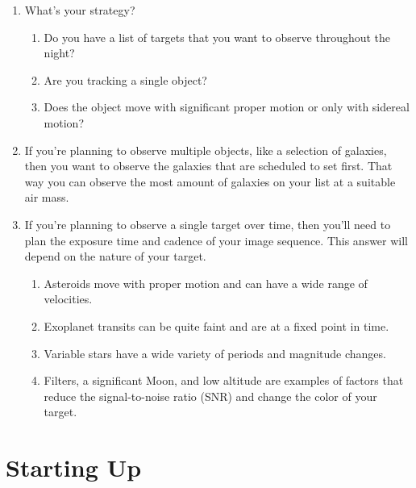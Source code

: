 \documentclass{article}
\begin{document}
			\begin{enumerate}

				\item What's your strategy?

				\begin{enumerate}

					\item Do you have a list of targets that you want to observe throughout the night?

					\item Are you tracking a single object?

					\item Does the object move with significant proper motion or only with sidereal motion?

				\end{enumerate}

				\item If you're planning to observe multiple objects, like a selection of galaxies, then you want to observe the galaxies that are scheduled to set first. That way you can observe the most amount of galaxies on your list at a suitable air mass.

				\item If you're planning to observe a single target over time, then you'll need to plan the exposure time and cadence of your image sequence. This answer will depend on the nature of your target.

				\begin{enumerate}

					\item Asteroids move with proper motion and can have a wide range of velocities.

					\item Exoplanet transits can be quite faint and are at a fixed point in time.

					\item Variable stars have a wide variety of periods and magnitude changes.

					\item Filters, a significant Moon, and low altitude are examples of factors that reduce the signal-to-noise ratio (SNR) and change the color of your target.

				\end{enumerate}

			\end{enumerate}

	\newpage
	\section{Starting Up}
\end{document}

